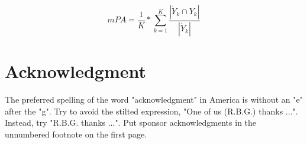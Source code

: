 \begin{equation}
mPA = \dfrac{1}{K}*\sum_{k=1}^{K}\dfrac{\left| \dot{Y}_k \cap Y_k \right|}{\left| \dot{Y}_k\right|}
\end{equation}



\section*{Acknowledgment}

The preferred spelling of the word "acknowledgment" in America is without
an "e" after the "g". Try to avoid the stilted expression, "One of us
(R.B.G.) thanks ...". Instead, try "R.B.G. thanks ...". Put sponsor
acknowledgments in the unnumbered footnote on the first page.








